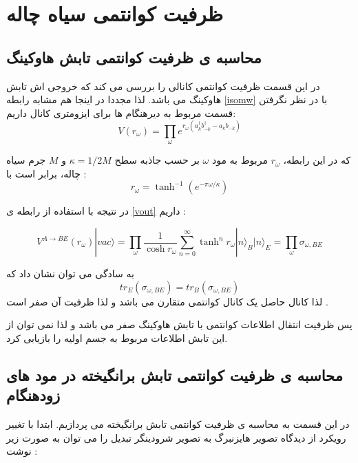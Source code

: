 \section{ظرفیت کوانتمی سیاه چاله}
\subsection{محاسبه ی ظرفیت  کوانتمی تابش هاوکینگ}
در این قسمت ظرفیت کوانتمی کانالی را بررسی می کند که خروجی اش تابش هاوکینگ می باشد. لذا مجددا در اینجا هم مشابه رابطه
\ref{isomw}
با در نظر نگرفتن قسمت مربوط به دیرهنگام ها برای ایزومتری کانال داریم:
\begin{equation} \label{isomrw}
V(r_\omega) =  \prod_{\omega} e^{ r_\omega (a_k^\dagger b_{-k}^\dagger - a_k b_{-k})}
\end{equation}

که در این رابطه،
$r_\omega$
مربوط به مود
$\omega$
بر حسب جاذبه سطح 
$\kappa = 1/2M$
و
$M$
جرم سیاه چاله، برابر است با 
\cite{qit}
:
\begin{equation}
	r_\omega = \tanh ^{-1} (e^{-\pi \omega / \kappa})
\end{equation}

در نتیجه با استفاده از رابطه ی 
\ref{vout} 
داریم
\cite{qit}:

\begin{equation} \label{qvout}
	V^{A \to BE}(r_\omega) |vac\rangle = \prod_\omega \frac{1}{\cosh r_\omega} \sum_{n=0}^{\infty} \tanh ^n r_\omega |n\rangle_B |n\rangle_E = \prod_\omega \sigma_{\omega, BE}
\end{equation}

به سادگی می توان نشان داد که 
\begin{equation}
	tr_E (\sigma_{\omega, BE}) = tr_B (\sigma_{\omega, BE})
\end{equation}
لذا کانال حاصل یک کانال کوانتمی متقارن
می باشد و لذا ظرفیت آن صفر است
\cite{qit}.

پس ظرفیت انتقال اطلاعات کوانتمی با تابش هاوکینگ صفر می باشد و لذا نمی توان از این تابش اطلاعات مربوط به جسم اولیه را بازیابی کرد.
\subsection{محاسبه ی ظرفیت  کوانتمی تابش برانگیخته در مود های زودهنگام}

در این قسمت به محاسبه ی ظرفیت کوانتمی تابش برانگیخته می پردازیم. ابتدا با تغییر رویکرد از دیدگاه تصویر هایزنبرگ به تصویر شرودینگر  تبدیل 
را می توان به صورت زیر نوشت
\cite{qit}
:

